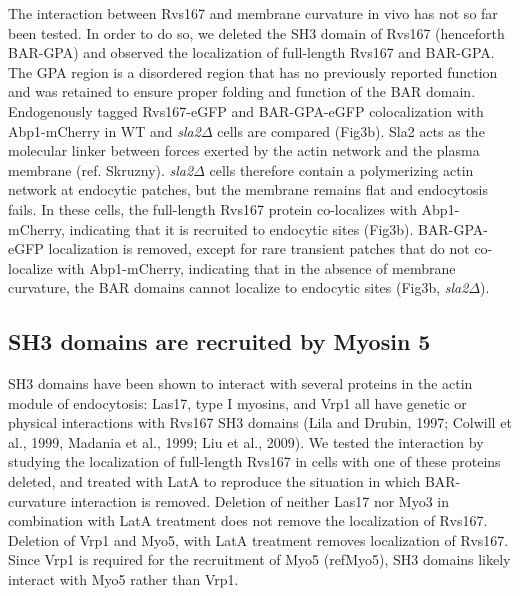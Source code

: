 \documentclass[9pt,lineno]{elife}
\begin{document}
The interaction between Rvs167 and membrane curvature in vivo has not so far been tested. In order to do so, we deleted the SH3 domain of Rvs167 (henceforth BAR-GPA) and observed the localization of full-length Rvs167 and BAR-GPA. The GPA region is a disordered region that has no previously reported function and was retained to ensure proper folding and function of the BAR domain. Endogenously tagged Rvs167-eGFP and BAR-GPA-eGFP colocalization with Abp1-mCherry in WT and \textit{sla2$\Delta$} cells are compared (Fig3b). Sla2 acts as the molecular linker between forces exerted by the actin network and the plasma membrane (ref. Skruzny). \textit{sla2$\Delta$} cells therefore contain a polymerizing actin network at endocytic patches, but the membrane remains flat and endocytosis fails. In these cells, the full-length Rvs167 protein co-localizes with Abp1-mCherry, indicating that it is recruited to endocytic sites (Fig3b). BAR-GPA-eGFP localization is removed, except for rare transient patches that do not co-localize with Abp1-mCherry, indicating that in the absence of membrane curvature, the BAR domains  cannot localize to endocytic sites (Fig3b, \textit{sla2$\Delta$}). 



\subsection{SH3 domains are recruited by Myosin 5}
SH3 domains have been shown to interact with several proteins in the actin module of endocytosis: Las17, type I myosins, and Vrp1 all have genetic or physical interactions with Rvs167 SH3 domains (Lila and Drubin, 1997; Colwill et al., 1999, Madania et al., 1999; Liu et al., 2009). 
We tested the interaction by studying the localization of full-length Rvs167 in cells with one of these proteins deleted, and treated with LatA to reproduce the situation in which BAR-curvature interaction is removed. 
Deletion of neither Las17 nor Myo3 in combination with LatA treatment does not remove the localization of Rvs167. Deletion of Vrp1 and Myo5, with LatA treatment removes localization of Rvs167. Since Vrp1 is required for the recruitment of Myo5 (refMyo5), SH3 domains likely interact with Myo5 rather than Vrp1. 
\end{document}
